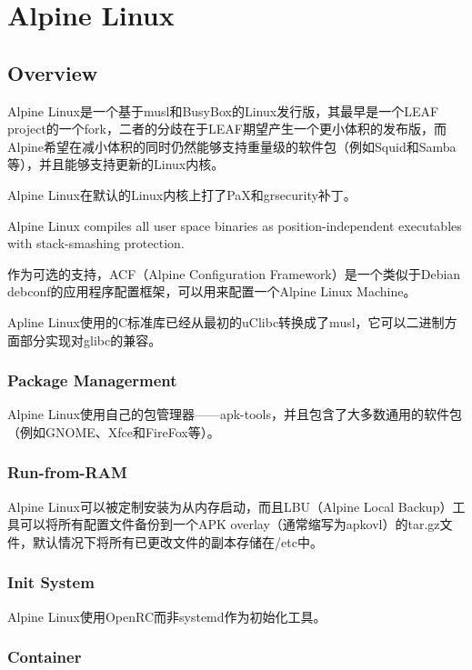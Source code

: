 \part{Alpine Linux}


\chapter{Overview}

Alpine Linux是一个基于musl和BusyBox的Linux发行版，其最早是一个LEAF project的一个fork，二者的分歧在于LEAF期望产生一个更小体积的发布版，而Alpine希望在减小体积的同时仍然能够支持重量级的软件包（例如Squid和Samba等），并且能够支持更新的Linux内核。

Alpine Linux在默认的Linux内核上打了PaX和grsecurity补丁。



Alpine Linux compiles all user space binaries as position-independent executables with stack-smashing protection.

作为可选的支持，ACF（Alpine Configuration Framework）是一个类似于Debian debconf的应用程序配置框架，可以用来配置一个Alpine Linux Machine。

Apline Linux使用的C标准库已经从最初的uClibc转换成了musl，它可以二进制方面部分实现对glibc的兼容。




\section{Package Managerment}


Alpine Linux使用自己的包管理器——apk-tools，并且包含了大多数通用的软件包（例如GNOME、Xfce和FireFox等）。

\section{Run-from-RAM}

Alpine Linux可以被定制安装为从内存启动，而且LBU（Alpine Local Backup）工具可以将所有配置文件备份到一个APK overlay（通常缩写为apkovl）的tar.gz文件，默认情况下将所有已更改文件的副本存储在/etc中。

\section{Init System}

Alpine Linux使用OpenRC而非systemd作为初始化工具。


\section{Container}

